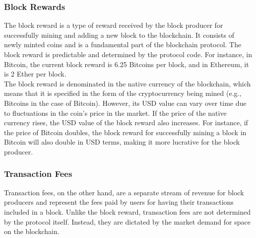 \subsubsection{Block Rewards}
The block reward is a type of reward received by the block producer for successfully mining and adding a new block to the blockchain. It consists of newly minted coins and is a fundamental part of the blockchain protocol. The block reward is predictable and determined by the protocol code. For instance, in Bitcoin, the current block reward is 6.25 Bitcoins per block, and in Ethereum, it is 2 Ether per block.\\
The block reward is denominated in the native currency of the blockchain, which means that it is specified in the form of the cryptocurrency being mined (e.g., Bitcoins in the case of Bitcoin). However, its USD value can vary over time due to fluctuations in the coin's price in the market. If the price of the native currency rises, the USD value of the block reward also increases. For instance, if the price of Bitcoin doubles, the block reward for successfully mining a block in Bitcoin will also double in USD terms, making it more lucrative for the block producer.

\subsubsection{Transaction Fees}
Transaction fees, on the other hand, are a separate stream of revenue for block producers and represent the fees paid by users for having their transactions included in a block. Unlike the block reward, transaction fees are not determined by the protocol itself. Instead, they are dictated by the market demand for space on the blockchain.\\

